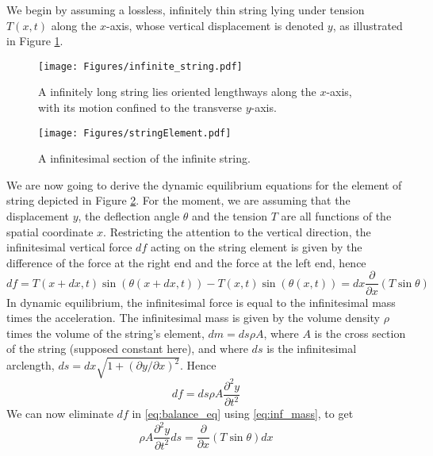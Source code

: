 \documentclass[11pt,twoside,a4paper,english]{book}
\begin{document}
We begin by assuming a lossless, infinitely thin string lying under tension $T(x,t)$ along the $x$-axis, whose vertical displacement is denoted $y$, as illustrated in Figure \ref{fig:infinite_string}. 
\begin{figure}[hbt]
\begin{center}
\texttt{[image: Figures/infinite\_string.pdf]}
\caption{A infinitely long string lies oriented lengthways along the $x$-axis, with its motion confined to the transverse $y$-axis.}
\label{fig:infinite_string}
\end{center}
\end{figure}
\begin{figure}[hbt]
\begin{center}
\texttt{[image: Figures/stringElement.pdf]}
\caption{A infinitesimal section of the infinite string. }
\label{fig:infinitesimal_string}
\end{center}
\end{figure}
We are now going to derive the dynamic equilibrium equations for the element of string depicted in Figure \ref{fig:infinitesimal_string}. For the moment, we are assuming that the displacement $y$, the deflection angle $\theta$ and the tension $T$ are all functions of the spatial coordinate $x$. Restricting the attention to the vertical direction, the infinitesimal vertical force $df$ acting on the string element is given by the difference of the force at the right end and the force at the left end, hence
\begin{equation}\label{eq:balance_eq}
df = T(x+dx,t) \sin\left( \theta(x+dx,t) \right) - T(x,t) \sin\left( \theta(x,t) \right) = dx \frac{\partial}{\partial x}(T \sin\theta)
\end{equation}
In dynamic equilibrium, the infinitesimal force is equal to the infinitesimal mass times the acceleration. The infinitesimal mass is given by the volume density $\rho$ times the volume of the string's element, $dm = ds \rho A$, where $A$ is the cross section of the string (supposed constant here), and where $ds$ is the infinitesimal arclength, $ds = dx \sqrt{1+(\partial y / \partial x)^2}$. Hence
\begin{equation}\label{eq:inf_mass}
df = ds \rho A \frac{\partial^2 y}{\partial t^2}
\end{equation}
We can now eliminate $df$ in  \eqref{eq:balance_eq} using \eqref{eq:inf_mass}, to get
\begin{equation}\label{eq:WEtheta}
\rho A \frac{\partial^2 y}{\partial t^2}ds = \frac{\partial}{\partial x}(T \sin\theta)dx
\end{equation}
\end{document}
